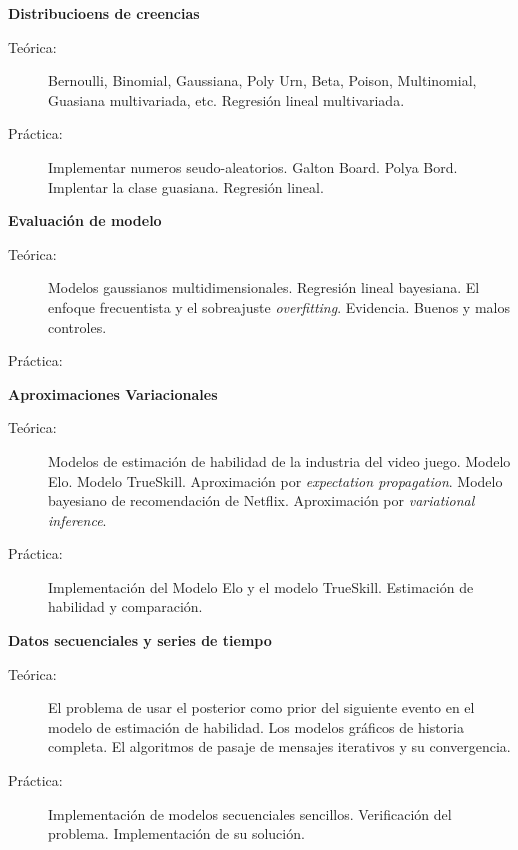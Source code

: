 \documentclass[10pt]{article}
\begin{document}
\begin{enumerate}
\begin{description}

\vspace{0.1cm}
\item \textbf{Distribucioens de creencias}
\vspace{-0.15cm}
\begin{description}
\item[Teórica:] Bernoulli, Binomial, Gaussiana, Poly Urn, Beta, Poison, Multinomial, Guasiana multivariada, etc. Regresión lineal multivariada.
\item[Práctica:] Implementar numeros seudo-aleatorios. Galton Board. Polya Bord. Implentar la clase guasiana. Regresión lineal.
\end{description}


\vspace{0.1cm}
\item \textbf{Evaluación de modelo}
\vspace{-0.15cm}
\begin{description}
\item[Teórica:] Modelos gaussianos multidimensionales. Regresión lineal bayesiana. El enfoque frecuentista y el sobreajuste \emph{overfitting}. Evidencia. Buenos y malos controles.
\item[Práctica:]
\end{description}


\vspace{0.1cm}
\item \textbf{Aproximaciones Variacionales}
\vspace{-0.15cm}
\begin{description}
\item[Teórica:] Modelos de estimación de habilidad de la industria del video juego. Modelo Elo. Modelo TrueSkill. Aproximación por \emph{expectation propagation}. Modelo bayesiano de recomendación de Netflix. Aproximación por \emph{variational inference}.
\item[Práctica:] Implementación del Modelo Elo y el modelo TrueSkill. Estimación de habilidad y comparación.
\end{description}


\vspace{0.1cm}
\item \textbf{Datos secuenciales y series de tiempo}
\vspace{-0.15cm}
\begin{description}
\item[Teórica:] El problema de usar el posterior como prior del siguiente evento en el modelo de estimación de habilidad. Los modelos gráficos de historia completa. El algoritmos de pasaje de mensajes iterativos y su convergencia.
\item[Práctica:] Implementación de modelos secuenciales sencillos. Verificación del problema. Implementación de su solución.
\end{description}


\end{description}
\end{enumerate}
\end{document}
